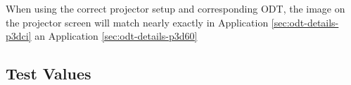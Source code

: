 When using the correct projector setup and corresponding ODT, the image on the projector screen will match nearly exactly in Application \ref{sec:odt-details-p3dci} an Application \ref{sec:odt-details-p3d60} 


\subsection{Test Values}
\testValuesSubSec{}


